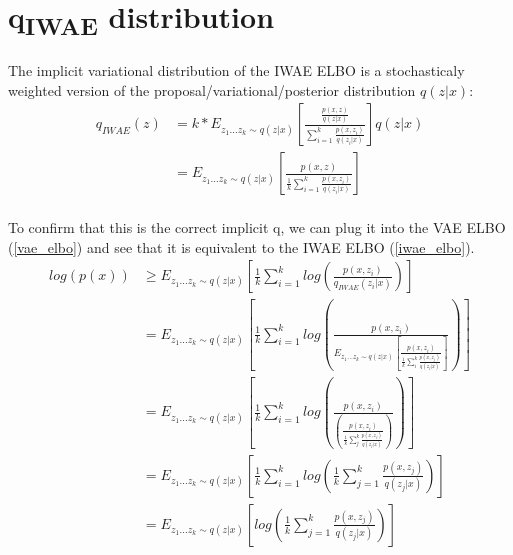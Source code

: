 \documentclass{article}
\begin{document}









\section{q\textsubscript{IWAE} distribution}

The implicit variational distribution of the IWAE ELBO is a stochasticaly weighted version of the proposal/variational/posterior distribution $q(z|x)$:
\begin{align} 
    q_{IWAE}(z) &= k*E_{z_{1}...z_{k} \sim q(z|x)} \left[\frac{\frac{p(x,z)}{q(z|x)}}{\sum_{i=1}^k \frac{p(x,z_i)}{q(z_i|x)}}  \right] q(z|x) \\
    &= E_{z_{1}...z_{k} \sim q(z|x)} \left[\frac{p(x,z)}{\frac{1}{k}\sum_{i=1}^k \frac{p(x,z_i)}{q(z_i|x)}}  \right]
\end{align}
\\
To confirm that this is the correct implicit q, we can plug it into the VAE ELBO (\ref{vae_elbo}) and see that it is equivalent to the IWAE ELBO (\ref{iwae_elbo}).
\begin{align} 
    log(p(x)) & \geq E_{z_{1}...z_{k} \sim q(z|x)} \left[  \frac{1}{k}\sum_{i=1}^k log\left(\frac{p(x,z_i)}{q_{IWAE}(z_i|x)}  \right)  \right] \\
    &= E_{z_{1}...z_{k} \sim q(z|x)} \left[  \frac{1}{k}\sum_{i=1}^k log\left(\frac{p(x,z_i)}{E_{z_{1}...z_{k} \sim q(z|x)} \left[\frac{p(x,z_i)}{\frac{1}{k}\sum_i^k \frac{p(x,z_j)}{q(z_j|x)}}  \right]}  \right)  \right] \label{with_e} \\
    &= E_{z_{1}...z_{k} \sim q(z|x)} \left[  \frac{1}{k}\sum_{i=1}^k log\left(\frac{p(x,z_i)}{\left(\frac{p(x,z_i)}{\frac{1}{k}\sum_j^k \frac{p(x,z_j)}{q(z_j|x)}}  \right)}  \right)  \right] \label{without_e} \\
    &= E_{z_{1}...z_{k} \sim q(z|x)} \left[  \frac{1}{k}\sum_{i=1}^k log\left(\frac{1}{k}\sum_{j=1}^k \frac{p(x,z_j)}{q(z_j|x)}  \right)  \right] \label{with_avg} \\
    &= E_{z_{1}...z_{k} \sim q(z|x)} \left[  log\left(\frac{1}{k}\sum_{j=1}^k \frac{p(x,z_j)}{q(z_j|x)}  \right)  \right] \label{without_avg}
\end{align}
\end{document}
